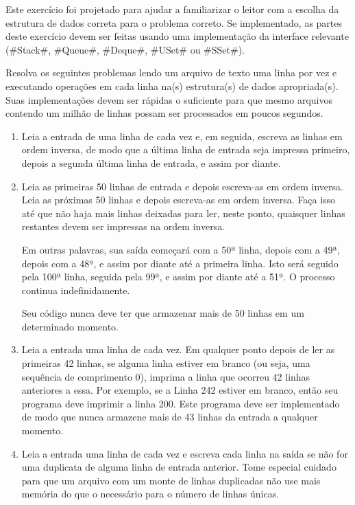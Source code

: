 	\begin{exc}
		Este exercício foi projetado para ajudar a familiarizar o leitor com a escolha da 
		estrutura de dados correta para o problema correto. Se implementado, as partes deste 
		exercício devem ser feitas usando uma implementação da interface relevante (#Stack#,
		 #Queue#, #Deque#, #USet# ou #SSet#).
		
		Resolva os seguintes problemas lendo um arquivo de texto uma linha por vez e 
		executando operações em cada linha na(s) estrutura(s) de dados apropriada(s). Suas 
		implementações devem ser rápidas o suficiente para que mesmo arquivos contendo um 
		milhão de linhas possam ser processados em poucos segundos.
		\begin{enumerate}
			\item Leia a entrada de uma linha de cada vez e, em seguida, escreva as linhas 
			em ordem inversa, de modo que a última linha de entrada seja impressa primeiro,
			depois a segunda última linha de entrada, e assim por diante.
			
			\item  Leia as primeiras 50 linhas de entrada e depois escreva-as em ordem 
			inversa. Leia as próximas 50 linhas e depois escreva-as em ordem inversa. Faça 
			isso até que não haja mais linhas deixadas para ler, neste ponto, quaisquer 
			linhas restantes devem ser impressas na ordem inversa.
			
			Em outras palavras, sua saída começará com a 50ª linha, depois com a 49ª, 
			depois com a 48ª, e assim por diante até a primeira linha. Isto será 
			seguido pela 100ª linha, seguida pela 99ª, e assim por diante até a 51ª. O processo continua indefinidamente.
			
			Seu código nunca deve ter que armazenar mais de 50 linhas em um determinado 
			momento.
			
			\item Leia a entrada uma linha de cada vez.
			Em qualquer ponto depois de ler as primeiras 42 linhas, se alguma linha estiver 
			em branco (ou seja, uma sequência de comprimento 0), imprima a linha que ocorreu 
			42 linhas anteriores a essa. Por exemplo, se a Linha 242 estiver em branco, 
			então seu programa deve imprimir a linha 200. Este programa deve ser 
			implementado de modo que nunca armazene mais de 43 linhas da entrada a qualquer 
			momento.
			
			\item Leia a entrada uma linha de cada vez e escreva cada linha na saída se não for uma duplicata de alguma linha de entrada anterior. Tome especial cuidado para que um arquivo com um monte de linhas duplicadas não use mais memória do que o necessário para o número de linhas únicas.
			

\end{enumerate}
\end{exc}
